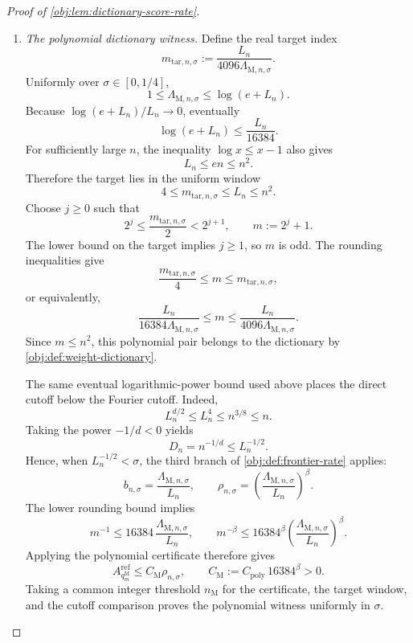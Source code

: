 \begin{proof}[Proof of \cref{obj:lem:dictionary-score-rate}]
\begin{enumerate}
Finally, the standard logarithmic-power comparison gives
\[
\frac{L_n^4}{n^{3/8}}\longrightarrow0,
\qquad
L_n^4\le n^{3/8}
\quad\text{for all sufficiently large }n.
\]
The degree condition implies \(1\le m\le L_n\). Since
\(\kappa+\beta+1\le4\), it follows that
\[
m^{\kappa+\beta+1}\le m^4\le L_n^4\le n^{3/8},
\qquad
n^{-3/8}m^{\kappa+1}\le m^{-\beta}.
\]
Also,
\[
n^{-1/2}\le n^{-3/8}
\le n^{-3/8}m^{\kappa+1}\le m^{-\beta}.
\]
Substitution into the reference score proves
\[
A_{q_m^{\mathrm M}}^{\mathrm{ref}}
\le C_{\mathrm{poly}}m^{-\beta},
\qquad
C_{\mathrm{poly}}
:=C_{\mathrm M,bias}+4C_{\mathrm M,ratio}+2\sqrt3>0,
\]
uniformly for all sufficiently large \(n\), all public \(\sigma\), and all positive odd \(m\) satisfying the degree condition.

\item \emph{The polynomial dictionary witness.}
Define the real target index
\[
m_{\mathrm{tar},n,\sigma}
:=\frac{L_n}{4096\Lambda_{\mathrm M,n,\sigma}}.
\]
Uniformly over \(\sigma\in[0,1/4]\),
\[
1\le\Lambda_{\mathrm M,n,\sigma}\le\log(e+L_n).
\]
Because \(\log(e+L_n)/L_n\to0\), eventually
\[
\log(e+L_n)\le\frac{L_n}{16384}.
\]
For sufficiently large \(n\), the inequality \(\log x\le x-1\) also gives
\[
L_n\le en\le n^2.
\]
Therefore the target lies in the uniform window
\[
4\le m_{\mathrm{tar},n,\sigma}\le L_n\le n^2.
\]
Choose \(j\ge0\) such that
\[
2^j\le\frac{m_{\mathrm{tar},n,\sigma}}2<2^{j+1},
\qquad
m:=2^j+1.
\]
The lower bound on the target implies \(j\ge1\), so \(m\) is odd. The rounding inequalities give
\[
\frac{m_{\mathrm{tar},n,\sigma}}4\le m\le m_{\mathrm{tar},n,\sigma},
\]
or equivalently,
\[
\frac{L_n}{16384\Lambda_{\mathrm M,n,\sigma}}
\le m
\le\frac{L_n}{4096\Lambda_{\mathrm M,n,\sigma}}.
\]
Since \(m\le n^2\), this polynomial pair belongs to the dictionary by \cref{obj:def:weight-dictionary}.

The same eventual logarithmic-power bound used above places the direct cutoff below the Fourier cutoff. Indeed,
\[
L_n^{d/2}\le L_n^4\le n^{3/8}\le n.
\]
Taking the power \(-1/d<0\) yields
\[
D_n=n^{-1/d}\le L_n^{-1/2}.
\]
Hence, when \(L_n^{-1/2}<\sigma\), the third branch of \cref{obj:def:frontier-rate} applies:
\[
b_{n,\sigma}
=\frac{\Lambda_{\mathrm M,n,\sigma}}{L_n},
\qquad
\rho_{n,\sigma}
=\left(\frac{\Lambda_{\mathrm M,n,\sigma}}{L_n}\right)^\beta.
\]
The lower rounding bound implies
\[
m^{-1}\le16384\,\frac{\Lambda_{\mathrm M,n,\sigma}}{L_n},
\qquad
m^{-\beta}
\le16384^\beta
\left(\frac{\Lambda_{\mathrm M,n,\sigma}}{L_n}\right)^\beta.
\]
Applying the polynomial certificate therefore gives
\[
A_{q_m^{\mathrm M}}^{\mathrm{ref}}
\le C_{\mathrm M}\rho_{n,\sigma},
\qquad
C_{\mathrm M}:=C_{\mathrm{poly}}\,16384^\beta>0.
\]
Taking a common integer threshold \(n_{\mathrm M}\) for the certificate, the target window, and the cutoff comparison proves the polynomial witness uniformly in \(\sigma\).


\end{enumerate}
\end{proof}
